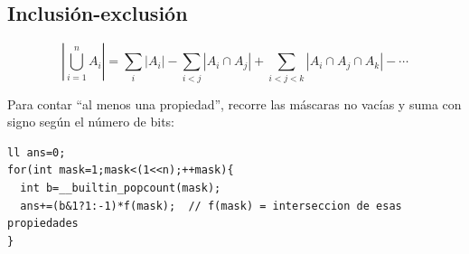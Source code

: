 \subsection{Inclusión-exclusión}\label{rec:ie}

\[
\left|\bigcup_{i=1}^{n}A_i\right|
=\sum_i|A_i|-\sum_{i<j}|A_i\cap A_j|
+\sum_{i<j<k}|A_i\cap A_j\cap A_k|-\cdots
\]

Para contar “al menos una propiedad”, recorre las máscaras no vacías y suma
con signo según el número de bits:

\begin{lstlisting}
ll ans=0;
for(int mask=1;mask<(1<<n);++mask){
  int b=__builtin_popcount(mask);
  ans+=(b&1?1:-1)*f(mask);  // f(mask) = interseccion de esas propiedades
}
\end{lstlisting}



